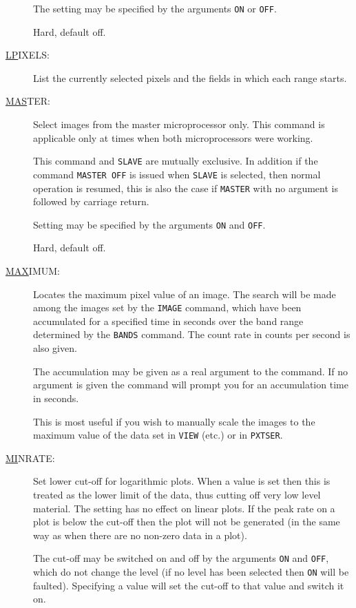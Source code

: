 \begin{description}
The setting may be specified by the arguments {\tt ON} or {\tt OFF}.

Hard, default off.

\item[\underline{LP}IXELS: ] \label{lp}
List the currently selected pixels and the fields in which each range
starts.

\item[\underline{MAS}TER: ] \label{mas}
Select images from the master microprocessor only. This command is
applicable only at times when both microprocessors were working.

This command and {\tt SLAVE} are mutually exclusive. In addition if the
command {\tt MASTER~OFF} is issued when {\tt SLAVE} is selected, then
normal operation is resumed, this is also the case if {\tt MASTER} with
no argument is followed by carriage return.

Setting may be specified by the arguments {\tt ON} and {\tt OFF}.

Hard, default off.

\item[\underline{MAX}IMUM: ] \label{max}
Locates the maximum pixel value of an image. The search will be made
among the images set by the {\tt IMAGE} command, which have been
accumulated for a specified time in seconds over the band range
determined by the {\tt BANDS} command.  The count rate in counts per
second is also given.

The accumulation may be given as a real argument to the command.  If no
argument is given the command will prompt you for an accumulation time
in seconds.

This is most useful if you wish to manually scale the images to the
maximum value of the data set in {\tt VIEW} (etc.) or in {\tt PXTSER}.

\item[\underline{MI}NRATE: ] \label{mi}
Set lower cut-off for logarithmic plots. When a value is set then this
is treated as the lower limit of the data, thus cutting off very low
level material. The setting has no effect on linear plots. If the peak
rate on a plot is below the cut-off then the plot will not be generated
(in the same way as when there are no non-zero data in a plot).

The cut-off may be switched on and off by the arguments {\tt ON} and
{\tt OFF}, which do not change the level (if no level has been selected
then {\tt ON} will be faulted). Specifying a value will set the cut-off
to that value and switch it on.


\end{description}
